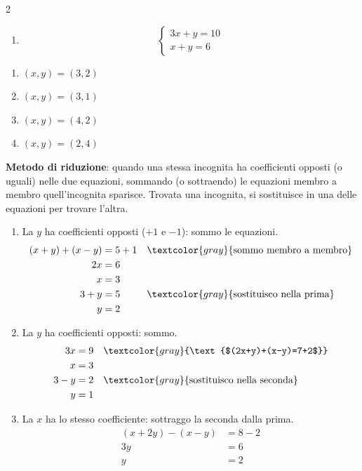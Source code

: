\begin{question}[ID=1.1, subtitle={Sistemi lineari di due equazioni}, difficulty=facile, tags={sistemi, equazioni lineari}]
\begin{multicols}{2}
\begin{enumerate}[leftmargin=3.2cm]
    \item
    \[
    \begin{cases}
    3x+y=10\\
    x+y=6
    \end{cases}
    \]
\end{enumerate}
\end{multicols}
\begin{solution}
\begin{enumerate}
    \item $(x,y)=(3,2)$
    \item $(x,y)=(3,1)$
    \item $(x,y)=(4,2)$
    \item $(x,y)=(2,4)$
\end{enumerate}
\end{solution}
\begin{explanation}
\textbf{Metodo di riduzione}: quando una stessa incognita ha coefficienti opposti (o uguali) nelle due equazioni, sommando (o sottraendo) le equazioni membro a membro quell'incognita sparisce. Trovata una incognita, si sostituisce in una delle equazioni per trovare l'altra.
\begin{enumerate}
    \item La $y$ ha coefficienti opposti ($+1$ e $-1$): sommo le equazioni.
    \[\begin{aligned}
    (x+y)+(x-y) &= 5+1 && \textcolor{gray}{\text{sommo membro a membro}}\\
    2x &= 6\\
    x &= 3\\
    3+y &= 5 && \textcolor{gray}{\text{sostituisco nella prima}}\\
    y &= 2
    \end{aligned}\]
    \item La $y$ ha coefficienti opposti: sommo.
    \[\begin{aligned}
    3x &= 9 && \textcolor{gray}{\text{$(2x+y)+(x-y)=7+2$}}\\
    x &= 3\\
    3-y &= 2 && \textcolor{gray}{\text{sostituisco nella seconda}}\\
    y &= 1
    \end{aligned}\]
    \item La $x$ ha lo stesso coefficiente: sottraggo la seconda dalla prima.
    \[\begin{aligned}
    (x+2y)-(x-y) &= 8-2\\
    3y &= 6\\
    y &= 2\\

\end{aligned}\]
\end{enumerate}
\end{explanation}
\end{question}
